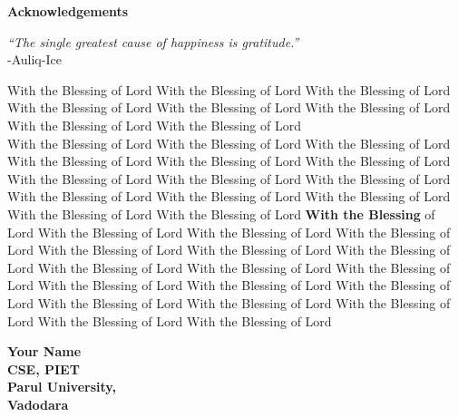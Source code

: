 \thispagestyle{empty}
\newpage
\cleardoublepage{}
{}
\begin{center}
{\Large \bf Acknowledgements}\\
\end{center}
\vspace{10pt}
\begin{flushright}
\textit{“The single greatest cause of happiness is gratitude.” }\\
\vspace{5mm}
-Auliq-Ice
\end{flushright}
\hspace{10mm}With the Blessing of Lord With the Blessing of Lord With the Blessing of Lord With the Blessing of Lord With the Blessing of Lord With the Blessing of Lord With the Blessing of Lord With the Blessing of Lord \\With the Blessing of Lord With the Blessing of Lord With the Blessing of Lord With the Blessing of Lord With the Blessing of Lord With the Blessing of Lord With the Blessing of Lord With the Blessing of Lord With the Blessing of Lord With the Blessing of Lord With the Blessing of Lord With the Blessing of Lord With the Blessing of Lord With the Blessing of Lord \textbf{With the Blessing} of Lord With the Blessing of Lord With the Blessing of Lord With the Blessing of Lord With the Blessing of Lord With the Blessing of Lord With the Blessing of Lord With the Blessing of Lord With the Blessing of Lord With the Blessing of Lord With the Blessing of Lord With the Blessing of Lord With the Blessing of Lord With the Blessing of Lord With the Blessing of Lord With the Blessing of Lord With the Blessing of Lord With the Blessing of Lord 

\vspace{1.5cm}
\begin{flushright}
\textbf{Your Name \\ CSE, PIET\\ Parul University, \\Vadodara}\\ 
\end{flushright}